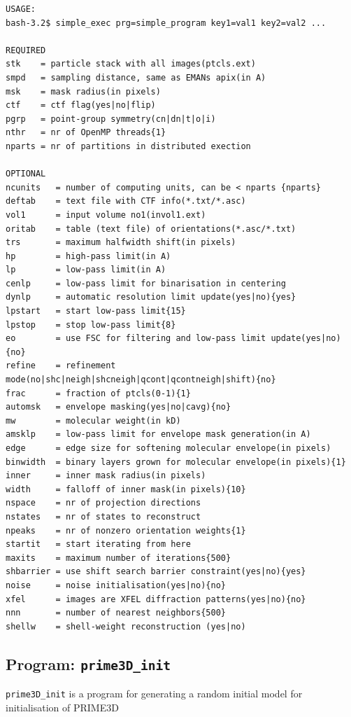 \documentclass[a4paper,11pt]{article}
\newcommand{\prgname}[1]{\textcolor{NavyBlue}{\texttt{#1}}}
\begin{document}
\begin{verbatim}
USAGE:
bash-3.2$ simple_exec prg=simple_program key1=val1 key2=val2 ...

REQUIRED
stk    = particle stack with all images(ptcls.ext)
smpd   = sampling distance, same as EMANs apix(in A)
msk    = mask radius(in pixels)
ctf    = ctf flag(yes|no|flip)
pgrp   = point-group symmetry(cn|dn|t|o|i)
nthr   = nr of OpenMP threads{1}
nparts = nr of partitions in distributed exection

OPTIONAL
ncunits   = number of computing units, can be < nparts {nparts}
deftab    = text file with CTF info(*.txt/*.asc)
vol1      = input volume no1(invol1.ext)
oritab    = table (text file) of orientations(*.asc/*.txt)
trs       = maximum halfwidth shift(in pixels)
hp        = high-pass limit(in A)
lp        = low-pass limit(in A)
cenlp     = low-pass limit for binarisation in centering
dynlp     = automatic resolution limit update(yes|no){yes}
lpstart   = start low-pass limit{15}
lpstop    = stop low-pass limit{8}
eo        = use FSC for filtering and low-pass limit update(yes|no){no}
refine    = refinement mode(no|shc|neigh|shcneigh|qcont|qcontneigh|shift){no}
frac      = fraction of ptcls(0-1){1}
automsk   = envelope masking(yes|no|cavg){no}
mw        = molecular weight(in kD)
amsklp    = low-pass limit for envelope mask generation(in A)
edge      = edge size for softening molecular envelope(in pixels)
binwidth  = binary layers grown for molecular envelope(in pixels){1}
inner     = inner mask radius(in pixels)
width     = falloff of inner mask(in pixels){10}
nspace    = nr of projection directions
nstates   = nr of states to reconstruct
npeaks    = nr of nonzero orientation weights{1}
startit   = start iterating from here
maxits    = maximum number of iterations{500}
shbarrier = use shift search barrier constraint(yes|no){yes}
noise     = noise initialisation(yes|no){no}
xfel      = images are XFEL diffraction patterns(yes|no){no}
nnn       = number of nearest neighbors{500}
shellw    = shell-weight reconstruction (yes|no)
\end{verbatim}

\subsection{Program: \prgname{prime3D\_init}}
\label{prime3D_init}
\prgname{prime3D\_init} is a program for generating a random initial model for initialisation of PRIME3D 
\end{document}
